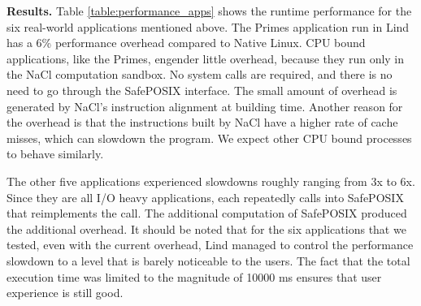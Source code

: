 {{\noindent
\textbf{Results.}
Table \ref{table:performance_apps} shows the runtime performance
for the six real-world applications mentioned above.
The Primes application run in Lind has a 6\% performance overhead compared to
Native Linux. CPU bound applications, like the Primes, engender little overhead,
because they run only in the NaCl computation sandbox. No system calls are required,
and there is no need to go through the SafePOSIX interface. The small amount of overhead
is generated by NaCl's instruction alignment at building time. Another reason for the overhead
is that the instructions built by NaCl have a higher rate of cache misses, which can slowdown the
program. We expect other CPU bound processes to behave similarly.

The other five applications experienced slowdowns roughly ranging from 3x to 6x.
Since they are all I/O heavy applications,
each repeatedly calls into SafePOSIX that reimplements
the call.  The additional computation of SafePOSIX produced the additional
overhead. It should be noted that for the six applications that we tested, even
with the current overhead, Lind managed to control the performance slowdown to a
 level that is barely noticeable to the users.
The fact that the total execution time was limited to the magnitude of 10000 ms ensures that
user experience is still good.

}}

